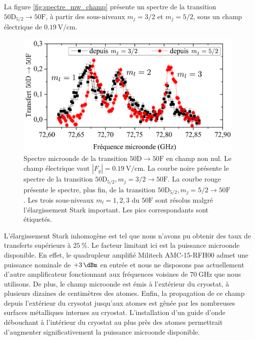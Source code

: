La figure \eqref{fig:spectre_mw_champ} présente un spectre de la transition $\mathrm{50D}_{5/2} \rightarrow \mathrm{50F}$, à partir des sous-niveaux $m_j = 3/2$ et $m_j = 5/2$, sous un champ électrique de $\SI{0.19}{\V/\cm}$.
%
\begin{figure}[!h]
\centering
\includegraphics[width=\linewidth]{figures/circulars/spectre_mw_champ_52et32}
\caption[Spectre microonde de la transition $\mathrm{50D\rightarrow 50F}$ en champ non nul]{
Spectre microonde de la transition $\mathrm{50D\rightarrow 50F}$ en champ non nul.
Le champ électrique vaut $|F_y| = \SI{0.19}{\V/\cm}$.
La courbe noire présente le spectre de la transition $\mathrm{50D_{5/2}},m_j=3/2 \rightarrow \mathrm{50F}$.
La courbe rouge présente le spectre, plus fin, de la transition $\mathrm{50D_{5/2}},m_j=5/2 \rightarrow \mathrm{50F}$.
Les trois sous-niveaux $m_l=1,2,3$ du $\mathrm{50F}$ sont résolus malgré l'élargissement Stark important.
Les pics correspondants sont étiquetés.
}
\label{fig:spectre_mw_champ}
\end{figure}
%
L'élargissement Stark inhomogène est tel que nous n'avons pu obtenir des taux de transferts supérieurs à $\SI{25}{\percent}$.
Le facteur limitant ici est la puissance microonde disponible.
En effet, le quadrupleur amplifié Militech AMC-15-RFH00 admet une puissance nominale de $\SI[retain-explicit-plus]{+3}{\dBm}$ en entrée et nous ne disposons pas actuellement d'autre amplificateur fonctionnant aux fréquences voisines de $\SI{70}{\GHz}$ que nous utilisons.
De plus, le champ microonde est émis à l'extérieur du cryostat, à plusieurs dizaines de centimètres des atomes.
Enfin, la propagation de ce champ depuis l'extérieur du crysotat jusqu'aux atomes est gênée par les nombreuses surfaces métalliques internes au cryostat.
L'installation d'un guide d'onde débouchant à l'intérieur du cryostat au plus près des atomes permettrait d'augmenter significativement la puissance microonde disponible.

